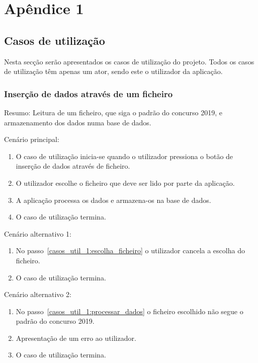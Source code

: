 \chapter{Apêndice 1} 
\label{apendice:1}

\section{Casos de utilização}
\label{apendice:casos_util}

Nesta secção serão apresentados os casos de utilização do projeto. Todos os casos de utilização têm apenas um ator, sendo este o utilizador da aplicação.

\subsection{Inserção de dados através de um ficheiro}
Resumo: Leitura de um ficheiro, que siga o padrão do concurso  2019, e armazenamento dos dados numa base de dados.

Cenário principal:

\begin{enumerate}
    \item O caso de utilização inicia-se quando o utilizador pressiona o botão de inserção de dados através de ficheiro.
    \item O utilizador escolhe o ficheiro que deve ser lido por parte da aplicação. \label{casos_util_1:escolha_ficheiro}
    \item A aplicação processa os dados e armazena-os na base de dados. \label{casos_util_1:processar_dados}
    \item O caso de utilização termina.
\end{enumerate}

Cenário alternativo 1:

\begin{enumerate}
    \item No passo~\ref{casos_util_1:escolha_ficheiro} o utilizador cancela a escolha do ficheiro.
    \item O caso de utilização termina.
\end{enumerate}

Cenário alternativo 2:

\begin{enumerate}
    \item No passo~\ref{casos_util_1:processar_dados} o ficheiro escolhido não segue o padrão do concurso  2019.
    \item Apresentação de um erro ao utilizador.
    \item O caso de utilização termina.
\end{enumerate}

